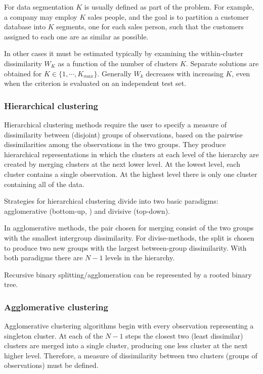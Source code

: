 \documentclass[12pt, letterpaper]{article}
\theoremstyle{definition}
\begin{document}
For data segmentation $K$ is usually defined as part of the problem. For example, a company may employ $K$ sales people, and the goal is to partition a customer database into $K$ segments, one for each sales person, such that the customers assigned to each one are as similar as possible.

In other cases it must be estimated typically by examining the within-cluster dissimilarity $W_K$ as a function of the number of clusters $K$. Separate solutions are obtained for $K \in \{1, \cdots , K_{max}\}$. Generally $W_k$ decreases with increasing $K$, even when the criterion is evaluated on an independent test set.

\subsubsection{Hierarchical clustering}
Hierarchical clustering methods require the user to specify a measure of dissimilarity between (disjoint) groups of observations, based on the pairwise dissimilarities among the observations in the two groups. They produce hierarchical representations in which the clusters at each level of the hierarchy are created by merging clusters at the next lower level. At the lowest level, each cluster contains a single observation. At the highest level there is only one cluster containing all of the data.

Strategies for hierarchical clustering divide into two basic paradigms: agglomerative (bottom-up, ) and divisive (top-down).

In agglomerative methods, the pair chosen for merging consist of the two groups with the smallest intergroup dissimilarity. For divise-methods, the split is chosen to produce two new groups with the largest between-group dissimilarity. With both paradigms there are $N - 1$ levels in the hierarchy.

Recursive binary splitting/agglomeration can be represented by a rooted binary tree. 

\subsubsection{Agglomerative clustering}
Agglomerative clustering algorithms begin with every observation representing a singleton cluster. At each of the $N - 1$ steps the closest two (least dissimilar) clusters are merged into a single cluster, producing one less cluster at the next higher level. Therefore, a measure of dissimilarity between two clusters (groups of observations) must be defined.
\end{document}
